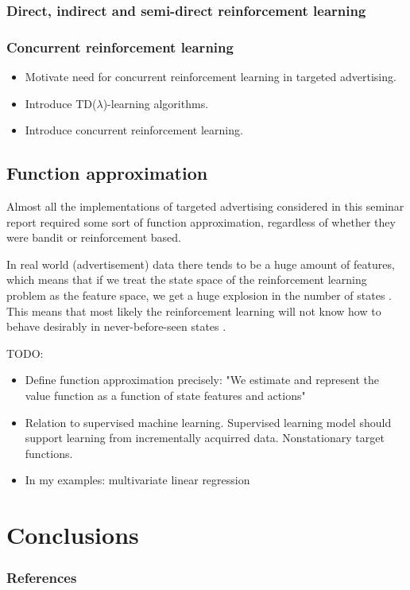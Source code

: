 \documentclass{article} %
\begin{document}
\subsubsection{Direct, indirect and semi-direct reinforcement learning}

\subsubsection{Concurrent reinforcement learning}

\begin{itemize}
  \item{Motivate need for concurrent reinforcement learning in targeted
    advertising.}
  \item{Introduce TD($\lambda$)-learning algorithms.}
  \item{Introduce concurrent reinforcement learning.}
\end{itemize}


\subsection{Function approximation}
\label{sec:function_approximation}
Almost all the implementations \cite{abe2002empirical, silver2013concurrent,
chapelle2011empirical} of targeted advertising considered in this seminar
report required some sort of function approximation, regardless of whether they
were bandit or reinforcement based.

In real world (advertisement) data there tends to be a huge amount of features,
which means that if we treat the state space of the reinforcement learning
problem as the feature space, we get a huge explosion in the number of states
\cite{abe2002empirical}.  This means that most likely the reinforcement
learning will not know how to behave desirably in never-before-seen states
\cite{book}.

TODO:
\begin{itemize}
  \item{Define function approximation precisely: "We estimate and represent the
    value function as a function of state features and actions"}
  \item{Relation to supervised machine learning. Supervised learning model
    should support learning from incrementally acquirred data. Nonstationary
  target functions.}
  \item{In my examples: multivariate linear regression}
\end{itemize}


\section{Conclusions}

\subsubsection*{References}

\printbibliography[heading=none]
\end{document}
